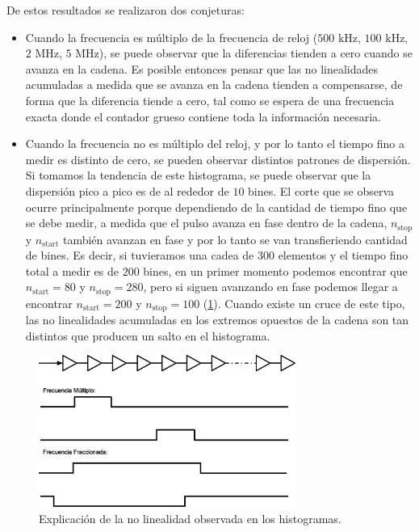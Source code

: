 De estos resultados se realizaron dos conjeturas:
 \begin{itemize}
     \item Cuando la frecuencia es múltiplo de la frecuencia de reloj ($500$ kHz, $100$ kHz, $2$ MHz, $5$ MHz),
     se puede observar que la diferencias tienden a cero cuando se avanza en la cadena. Es posible entonces pensar que las no linealidades
     acumuladas a medida que se avanza en la cadena tienden a compensarse, de forma que la diferencia tiende a cero,
     tal como se espera de una frecuencia exacta donde el contador grueso contiene toda la información necesaria.
     \item Cuando la frecuencia no es múltiplo del reloj, y por lo tanto el tiempo fino a medir es distinto de cero,
     se pueden observar distintos patrones de dispersión. Si tomamos la tendencia de este histograma, se puede observar
     que la dispersión pico a pico es de al rededor de $10$ bines. El corte que se observa ocurre principalmente porque 
     dependiendo de la cantidad de tiempo fino que se debe medir, a medida que el pulso avanza en fase dentro
     de la cadena, $n_\text{stop}$ y $n_\text{start}$ también avanzan en fase y por lo tanto se van transfieriendo cantidad de bines.
     Es decir, si tuvieramos una cadea de $300$ elementos y el tiempo fino total a medir es de $200$ bines, en un primer momento podemos encontrar que $n_\text{start} = 80$
     y $n_\text{stop} = 280$, pero si siguen avanzando en fase podemos llegar a encontrar $n_\text{start} = 200$ y $n_\text{stop} = 100$ (\ref{fig: no linealidades}).
     Cuando existe un cruce de este tipo, las no linealidades acumuladas en los extremos opuestos de la cadena son tan distintos que
     producen un salto en el histograma.
 \end{itemize}

 \begin{figure}[H]
     \centering
     \includegraphics[width=0.75\textwidth]{imagenes/no-linealidades.eps}
     \caption{Explicación de la no linealidad observada en los histogramas.}
     \label{fig: no linealidades}
 \end{figure}



